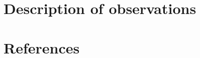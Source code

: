 \documentclass[12pt,a4paper]{article}  %
\begin{document}
\section{Description of observations}



\section*{References}




\end{document}
